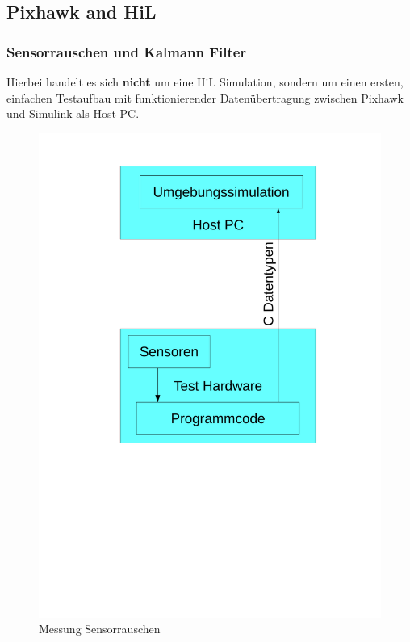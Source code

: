 \subsection{Pixhawk and HiL}
\label{sec:Pixhawk_and_HiL}


\subsubsection{Sensorrauschen und Kalmann Filter}
Hierbei handelt es sich \textbf{nicht} um eine HiL Simulation, sondern um einen ersten, einfachen Testaufbau mit funktionierender Datenübertragung zwischen Pixhawk und Simulink als Host PC. 

\begin{figure}[ht]
  \begin{center}
  \includegraphics[scale=0.5, trim={5cm 10.6cm 2.5cm 2cm},clip]{pic/35_hil/hil_sensor_noise.pdf}
  \caption{Messung Sensorrauschen}
  \label{fig:messung_sensorrauschen}
  \end{center}
\end{figure}

